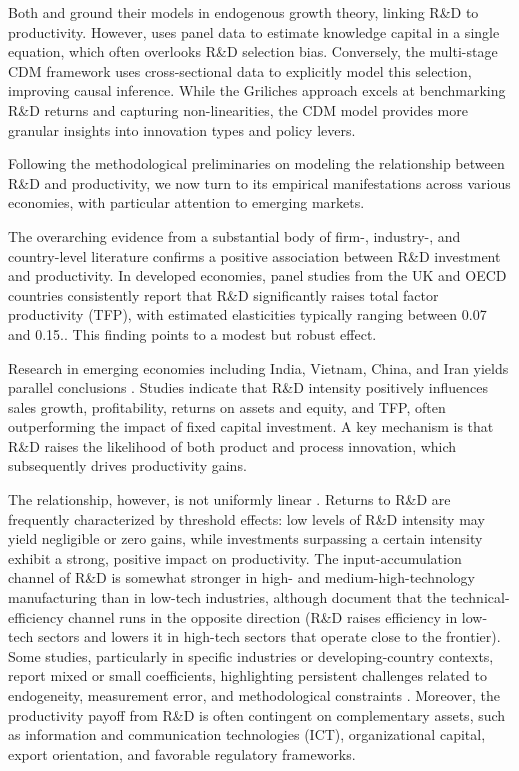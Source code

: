 \documentclass[a4paper, 12pt]{article}
\begin{document}
Both \textcite{griliches1979issues} and \textcite{crepon1998research} ground their models in endogenous growth theory, linking R\&D to productivity. However, \textcite{griliches1979issues} uses panel data to estimate knowledge capital in a single equation, which often overlooks R\&D selection bias. Conversely, the \textcite{crepon1998research} multi-stage CDM framework uses cross-sectional data to explicitly model this selection, improving causal inference. While the Griliches approach excels at benchmarking R\&D returns and capturing non-linearities, the CDM model provides more granular insights into innovation types and policy levers.

Following the methodological preliminaries on modeling the relationship between R\&D and productivity, we now turn to its empirical manifestations across various economies, with particular attention to emerging markets.

The overarching evidence from a substantial body of firm-, industry-, and country-level literature confirms a positive association between R\&D investment and productivity. In developed economies, panel studies from the UK and OECD countries consistently report that R\&D significantly raises total factor productivity (TFP), with estimated elasticities typically ranging between 0.07 and 0.15.\parencite{Pieri2018Modelling,Kancs2016R&D,Onyekwere2019The,Parisi2006Productivity}. This finding points to a modest but robust effect. 

Research in emerging economies including India, Vietnam, China, and Iran yields parallel conclusions \parencite{Manogna2021Does,Zhu2021How,Ding2024R&D,Tung2021The}. Studies indicate that R\&D intensity positively influences sales growth, profitability, returns on assets and equity, and TFP, often outperforming the impact of fixed capital investment. A key mechanism is that R\&D raises the likelihood of both product and process innovation, which subsequently drives productivity gains.

The relationship, however, is not uniformly linear \parencite{Kancs2016R&D}. Returns to R\&D are frequently characterized by threshold effects: low levels of R\&D intensity may yield negligible or zero gains, while investments surpassing a certain intensity exhibit a strong, positive impact on productivity. The input-accumulation channel of R\&D is somewhat stronger in high- and medium-high-technology manufacturing than in low-tech industries, although \textcite{Pieri2018Modelling} document that the technical-efficiency channel runs in the opposite direction (R\&D raises efficiency in low-tech sectors and lowers it in high-tech sectors that operate close to the frontier). Some studies, particularly in specific industries or developing-country contexts, report mixed or small coefficients, highlighting persistent challenges related to endogeneity, measurement error, and methodological constraints \parencite{Onyekwere2019The,Zhu2021How}. Moreover, the productivity payoff from R\&D is often contingent on complementary assets, such as information and communication technologies (ICT), organizational capital, export orientation, and favorable regulatory frameworks.
\end{document}
